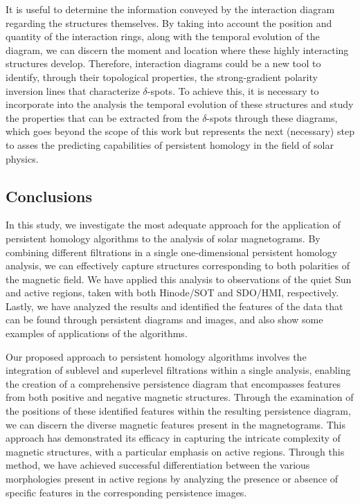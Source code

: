 It is useful to determine the information conveyed by the interaction diagram regarding the structures themselves. By taking into account the position and quantity of the interaction rings, along with the temporal evolution of the diagram, we can discern the moment and location where these highly interacting structures develop. Therefore, interaction diagrams could be a new tool to identify, through their topological properties, the strong-gradient polarity inversion lines that characterize $\delta$-spots. To achieve this, it is necessary to incorporate into the analysis the temporal evolution of these structures and study the properties that can be extracted from the $\delta$-spots through these diagrams, which goes beyond the scope of this work but represents the next (necessary) step to asses the predicting capabilities of persistent homology in the field of solar physics.

\subsection{Conclusions}
In this study, we investigate the most adequate approach for the application of persistent homology algorithms to the analysis of solar magnetograms. By combining different filtrations in a single one-dimensional persistent homology analysis, we can effectively capture structures corresponding to both polarities of the magnetic field. We have applied this analysis to observations of the quiet Sun and active regions, taken with both Hinode/SOT and SDO/HMI, respectively. Lastly, we have analyzed the results and identified the features of the data that can be found through persistent diagrams and images, and also show some examples of applications of the algorithms. 

Our proposed approach to persistent homology algorithms involves the integration of sublevel and superlevel filtrations within a single analysis, enabling the creation of a comprehensive persistence diagram that encompasses features from both positive and negative magnetic structures. Through the examination of the positions of these identified features within the resulting persistence diagram, we can discern the diverse magnetic features present in the magnetograms. This approach has demonstrated its efficacy in capturing the intricate complexity of magnetic structures, with a particular emphasis on active regions. Through this method, we have achieved successful differentiation between the various morphologies present in active regions by analyzing the presence or absence of specific features in the corresponding persistence images. 

